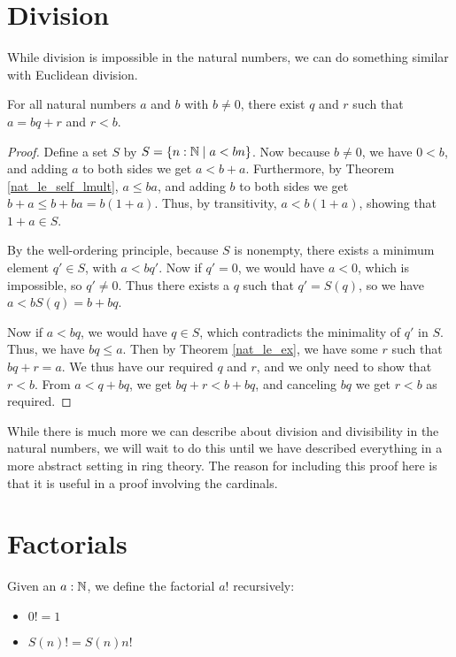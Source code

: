 \documentclass[../../math.tex]{subfiles}
\begin{document}
\section{Division}

While division is impossible in the natural numbers, we can do something similar
with Euclidean division.

\begin{theorem}
    For all natural numbers $a$ and $b$ with $b \neq 0$, there exist $q$ and $r$
    such that $a = bq + r$ and $r < b$.
\end{theorem}
\begin{proof}
    Define a set $S$ by $S = \{n : \mathbb{N} \mid a < bn\}$.  Now because $b \neq 0$,
    we have $0 < b$, and adding $a$ to both sides we get $a < b + a$.
    Furthermore, by Theorem \ref{nat_le_self_lmult}, $a \leq ba$, and adding $b$
    to both sides we get $b + a \leq b + ba = b(1 + a)$.  Thus, by transitivity,
    $a < b(1 + a)$, showing that $1 + a \in S$.

    By the well-ordering principle, because $S$ is nonempty, there exists a
    minimum element $q' \in S$, with $a < bq'$.  Now if $q' = 0$, we would have
    $a < 0$, which is impossible, so $q' \neq 0$.  Thus there exists a $q$ such
    that $q' = S(q)$, so we have $a < bS(q) = b + bq$.

    Now if $a < bq$, we would have $q \in S$, which contradicts the minimality
    of $q'$ in $S$.  Thus, we have $bq \leq a$.  Then by Theorem
    \ref{nat_le_ex}, we have some $r$ such that $bq + r = a$.  We thus have our
    required $q$ and $r$, and we only need to show that $r < b$.  From $a < q +
    bq$, we get $bq + r < b + bq$, and canceling $bq$ we get $r < b$ as
    required.
\end{proof}

While there is much more we can describe about division and divisibility in the
natural numbers, we will wait to do this until we have described everything in a
more abstract setting in ring theory.  The reason for including this proof here
is that it is useful in a proof involving the cardinals.

\section{Factorials}

\begin{definition}
    Given an $a : \mathbb{N}$, we define the factorial $a!$ recursively:
    \begin{itemize}
        \item $0! = 1$
        \item $S(n)! = S(n) n!$
    \end{itemize}
\end{definition}
\end{document}

